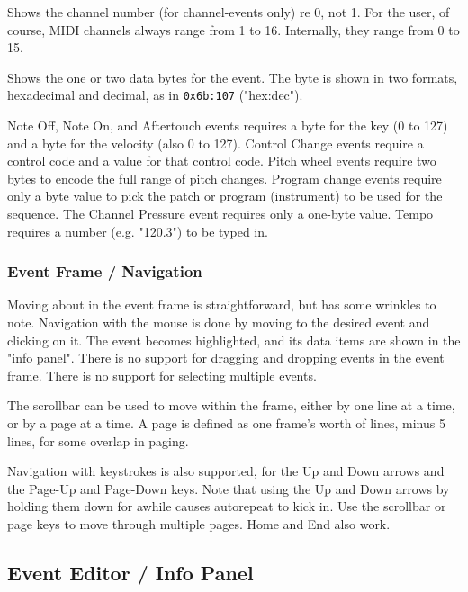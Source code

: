    Shows the channel number (for channel-events only) re 0, not 1.
   For the user, of course, MIDI channels always range from
   1 to 16.  Internally, they range from 0 to 15.

   Shows the one or two data bytes for the event.
   The byte is shown in two formats, hexadecimal and decimal, as in
   \texttt{0x6b:107} ("hex:dec").

   Note Off, Note On, and Aftertouch events requires a byte for the key (0 to
   127) and a byte for the velocity (also 0 to 127).
   Control Change events require a control code and a value for that control
   code.  Pitch wheel events require two bytes to encode the full range of
   pitch changes.
   Program change events require only a byte value to pick the patch or program
   (instrument) to be used for the sequence.  The Channel Pressure event
   requires only a one-byte value.
   Tempo requires a number (e.g. "120.3") to be typed in.

\subsubsection{Event Frame / Navigation}
\label{subsec:event_frame_navigation}

   Moving about in the event frame is straightforward, but has some
   wrinkles to note.
   Navigation with the mouse is done by moving to the desired event and
   clicking on it.  The event becomes highlighted, and its data items are shown
   in the "info panel".
   There is no support for dragging and dropping events in the event frame.
   There is no support for selecting multiple events.

   The scrollbar can be used to move within the frame, either by one line at a
   time, or by a page at a time.  A page is defined as one frame's worth of
   lines, minus 5 lines, for some overlap in paging.

   Navigation with keystrokes is also supported, for the Up and Down arrows and
   the Page-Up and Page-Down keys.  Note that using the Up and Down arrows by
   holding them down for awhile causes autorepeat to kick in.
   Use the scrollbar or page keys to
   move through multiple pages.  Home and End also work.

\subsection{Event Editor / Info Panel}
\label{subsec:event_editor_info}

